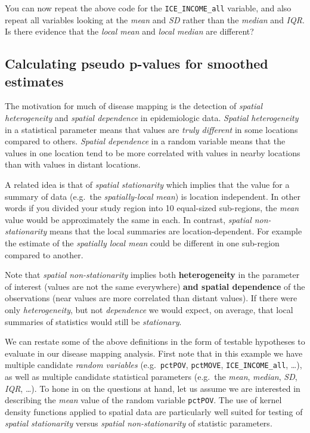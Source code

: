 \documentclass[
]{book}
\begin{document}
You can now repeat the above code for the \texttt{ICE\_INCOME\_all} variable, and also repeat all variables looking at the \emph{mean} and \emph{SD} rather than the \emph{median} and \emph{IQR}. Is there evidence that the \emph{local mean} and \emph{local median} are different?

\hypertarget{calculating-pseudo-p-values-for-smoothed-estimates}{%
\subsection{Calculating pseudo p-values for smoothed estimates}\label{calculating-pseudo-p-values-for-smoothed-estimates}}

The motivation for much of disease mapping is the detection of \emph{spatial heterogeneity} and \emph{spatial dependence} in epidemiologic data. \emph{Spatial heterogeneity} in a statistical parameter means that values are \emph{truly different} in some locations compared to others. \emph{Spatial dependence} in a random variable means that the values in one location tend to be more correlated with values in nearby locations than with values in distant locations.

A related idea is that of \emph{spatial stationarity} which implies that the value for a summary of data (e.g.~the \emph{spatially-local mean}) is location independent. In other words if you divided your study region into 10 equal-sized sub-regions, the \emph{mean} value would be approximately the same in each. In contrast, \emph{spatial non-stationarity} means that the local summaries are location-dependent. For example the estimate of the \emph{spatially local mean} could be different in one sub-region compared to another.

Note that \emph{spatial non-stationarity} implies both \textbf{heterogeneity} in the parameter of interest (values are not the same everywhere) \textbf{and spatial dependence} of the observations (near values are more correlated than distant values). If there were only \emph{heterogeneity}, but not \emph{dependence} we would expect, on average, that local summaries of statistics would still be \emph{stationary}.

We can restate some of the above definitions in the form of testable hypotheses to evaluate in our disease mapping analysis. First note that in this example we have multiple candidate \emph{random variables} (e.g.~\texttt{pctPOV}, \texttt{pctMOVE}, \texttt{ICE\_INCOME\_all}, \ldots), as well as multiple candidate statistical parameters (e.g.~the \emph{mean}, \emph{median}, \emph{SD}, \emph{IQR}, \ldots). To hone in on the questions at hand, let us assume we are interested in describing the \emph{mean} value of the random variable \texttt{pctPOV}. The use of kernel density functions applied to spatial data are particularly well suited for testing of \emph{spatial stationarity} versus \emph{spatial non-stationarity} of statistic parameters.
\end{document}
